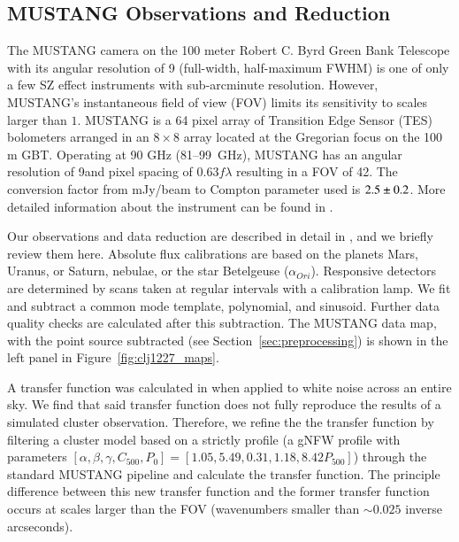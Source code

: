 \documentclass[twocolumn,traditabstract]{aa}
\begin{document}
\subsection{MUSTANG Observations and Reduction}
\label{sec:musobs}
The MUSTANG camera \citep{dicker2008}
on the 100 meter Robert C. Byrd Green Bank Telescope \citep[GBT, ][]{jewell2004} with its angular resolution of 9\asec 
(full-width, half-maximum FWHM) is one of only a few SZ effect instruments with sub-arcminute resolution.
However, MUSTANG's instantaneous field of view (FOV) limits its sensitivity to scales larger than $1$\amin.
MUSTANG is a 64 pixel array of Transition Edge Sensor (TES) bolometers arranged in an $8 \times 8$ array
located at the Gregorian focus on the 100 m GBT. Operating at 90 GHz (81--99~GHz),
MUSTANG has an angular resolution of 9\asec and pixel spacing of 0.63$f \lambda$ resulting in a FOV
of 42\asec. The conversion factor from mJy/beam to Compton parameter used is $\-2.5 \pm 0.2$.
More detailed information about the instrument can be found in \citet{dicker2008}. 

Our observations and data reduction are described in detail in \citet{romero2015a}, and we briefly review them
here. Absolute flux calibrations are based on the planets Mars, Uranus, or Saturn, nebulae, or the star Betelgeuse 
($\alpha_{Ori}$). Responsive detectors are determined by scans taken at regular intervals with a calibration lamp.
We fit and subtract a common mode template, polynomial, and sinusoid. Further data quality checks are calculated
after this subtraction. The MUSTANG data map, with the point source subtracted (see Section~\ref{sec:preprocessing})
is shown in the left panel in Figure~\ref{fig:clj1227_maps}.

A transfer function was calculated in \citet{romero2016} when applied to white noise
across an entire sky. We find that said transfer function does not fully reproduce the results of a simulated
cluster observation. Therefore, we refine the the transfer function by filtering a cluster model based on a strictly
 profile (a gNFW profile with parameters
$[\alpha,\beta,\gamma,C_{500},P_0]=[1.05,5.49,0.31,1.18,8.42 P_{500}]$) through the standard MUSTANG pipeline and calculate
the transfer function. The principle difference between this new transfer function and the former transfer function
occurs at scales larger than the FOV (wavenumbers smaller than $\sim0.025$ inverse arcseconds).
\end{document}
